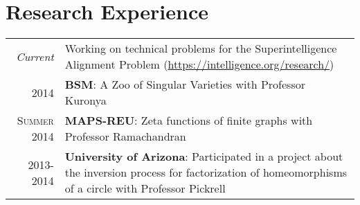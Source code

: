 \documentclass[a4paper,10pt]{article}
\begin{document}

\section{Research Experience}
\begin{tabular}{rp{10cm}}
	\emph{Current} & Working on technical problems for the Superintelligence Alignment Problem (\url{https://intelligence.org/research/})\\
	2014 & \textbf{BSM}: A Zoo of Singular Varieties with Professor Kuronya\\
	\textsc{Summer} 2014 & \textbf{MAPS-REU}: Zeta functions of finite graphs with Professor Ramachandran\\
	2013-2014& \textbf{University of Arizona}: Participated in a project about the inversion process for factorization of homeomorphisms of a circle with Professor Pickrell\\
\end{tabular}
\end{document}
